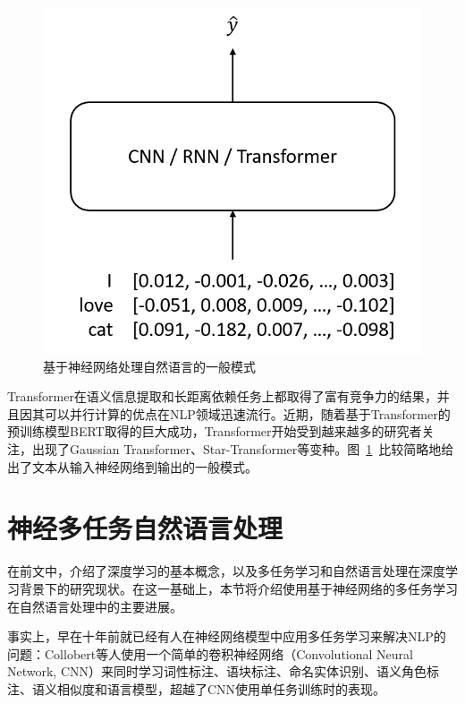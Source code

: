 \begin{figure}[htb]
	\centering
	\includegraphics[scale=0.6]{nlp_ppl.png}
	\caption{基于神经网络处理自然语言的一般模式}
	\label{fig:nlp_ppl}
\end{figure}

Transformer在语义信息提取和长距离依赖任务上都取得了富有竞争力的结果\cite{DBLP:conf/emnlp/TangMRS18}，并且因其可以并行计算的优点在NLP领域迅速流行。近期，随着基于Transformer的预训练模型BERT\cite{devlin2018bert}取得的巨大成功，Transformer开始受到越来越多的研究者关注，出现了Gaussian Transformer\cite{guo2019gaussian}、Star-Transformer\cite{guo2019star}等变种。图~\ref{fig:nlp_ppl}~比较简略地给出了文本从输入神经网络到输出的一般模式。

\section{神经多任务自然语言处理}
\label{sec:mtl4nlp}
在前文中，介绍了深度学习的基本概念，以及多任务学习和自然语言处理在深度学习背景下的研究现状。在这一基础上，本节将介绍使用基于神经网络的多任务学习在自然语言处理中的主要进展。

事实上，早在十年前就已经有人在神经网络模型中应用多任务学习来解决NLP的问题：Collobert等人\cite{DBLP:conf/icml/CollobertW08}使用一个简单的卷积神经网络（Convolutional Neural Network, CNN）来同时学习词性标注、语块标注、命名实体识别、语义角色标注、语义相似度和语言模型，超越了CNN使用单任务训练时的表现。

